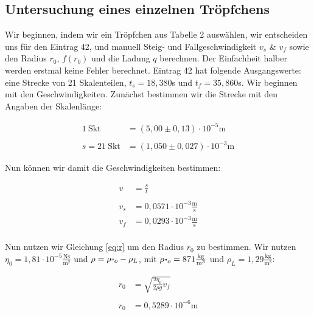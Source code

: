 \documentclass{article}
\begin{document}
\subsection{Untersuchung eines einzelnen Tröpfchens}

Wir beginnen, indem wir ein Tröpfchen aus Tabelle 2 auswählen, wir entscheiden uns für den Eintrag 42, und manuell Steig- und Fallgeschwindigkeit $v_s$ \& $v_f$ sowie den Radius $r_0$, $f(r_0)$ und die Ladung $q$ berechnen. Der Einfachheit halber werden erstmal keine Fehler berechnet. Eintrag 42 hat folgende Ausgangswerte: eine Strecke von 21 Skalenteilen, $t_s = 18,380$s und $t_f = 35,860$s. Wir beginnen mit den Geschwindigkeiten. Zunächst bestimmen wir die Strecke mit den Angaben der Skalenlänge:

\begin{equation}
    \begin{split}
        1 \ \text{Skt} &= (5,00 \pm 0,13) \cdot 10^{-5} \text{m} \\ \\
        s = 21 \ \text{Skt} &= (1,050 \pm 0,027) \cdot 10^{-3} \text{m}
    \end{split}
    \label{r:s}
\end{equation}

Nun können wir damit die Geschwindigkeiten bestimmen:

\begin{equation}
    \begin{split}
        v &= \frac{s}{t} \\ \\%
        v_s &= 0,0571 \cdot 10^{-3} \frac{\text{m}}{\text{s}} \\
        v_f &= 0,0293 \cdot 10^{-3} \frac{\text{m}}{\text{s}} \\
    \end{split}
    \label{r:v}
\end{equation}

Nun nutzen wir Gleichung \ref{eq:r} um den Radius $r_0$ zu bestimmen. Wir nutzen $\eta_0 = 1,81 \cdot 10^{-5} \frac{\text{Ns}}{\text{m}^2}$ und $\rho = \rho_{"o} - \rho_L$, mit $\rho_{"o} = 871 \frac{\text{kg}}{\text{m}^3}$ und $\rho_{L} = 1,29 \frac{\text{kg}}{\text{m}^3}$:

\begin{equation}
    \begin{split}
        r_0 &= \sqrt{\frac{9 \eta_0}{2 \rho g}v_f} \\ \\%
        r_0 &= 0,5289 \cdot 10^{-6} \text{m}
    \end{split}
\end{equation}
\end{document}

